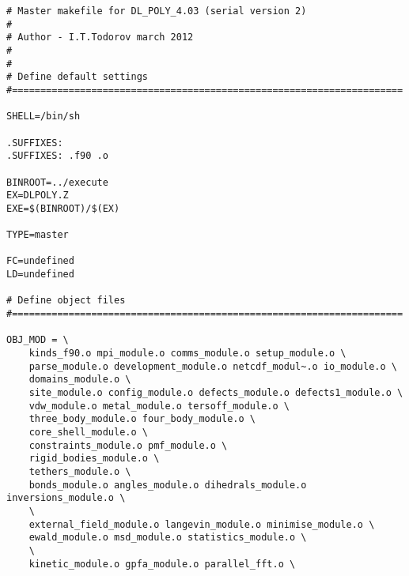 \begin{verbatim}
# Master makefile for DL_POLY_4.03 (serial version 2)
#
# Author - I.T.Todorov march 2012
#
#
# Define default settings
#=====================================================================

SHELL=/bin/sh

.SUFFIXES:
.SUFFIXES: .f90 .o

BINROOT=../execute
EX=DLPOLY.Z
EXE=$(BINROOT)/$(EX)

TYPE=master

FC=undefined
LD=undefined

# Define object files
#=====================================================================

OBJ_MOD = \
	kinds_f90.o mpi_module.o comms_module.o setup_module.o \
	parse_module.o development_module.o netcdf_modul~.o io_module.o \
	domains_module.o \
	site_module.o config_module.o defects_module.o defects1_module.o \
	vdw_module.o metal_module.o tersoff_module.o \
	three_body_module.o four_body_module.o \
	core_shell_module.o \
	constraints_module.o pmf_module.o \
	rigid_bodies_module.o \
	tethers_module.o \
	bonds_module.o angles_module.o dihedrals_module.o inversions_module.o \
	\
	external_field_module.o langevin_module.o minimise_module.o \
	ewald_module.o msd_module.o statistics_module.o \
	\
	kinetic_module.o gpfa_module.o parallel_fft.o \


\end{verbatim}
